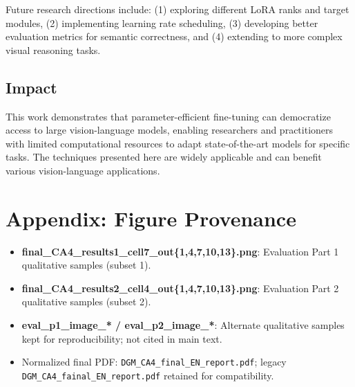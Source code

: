 \documentclass[conference]{IEEEtran}
\begin{document}
Future research directions include: (1) exploring different LoRA ranks and target modules, (2) implementing learning rate scheduling, (3) developing better evaluation metrics for semantic correctness, and (4) extending to more complex visual reasoning tasks.

\subsection{Impact}

This work demonstrates that parameter-efficient fine-tuning can democratize access to large vision-language models, enabling researchers and practitioners with limited computational resources to adapt state-of-the-art models for specific tasks. The techniques presented here are widely applicable and can benefit various vision-language applications.

\section{Appendix: Figure Provenance}
\begin{itemize}
    \item \textbf{final\_CA4\_results1\_cell7\_out\{1,4,7,10,13\}.png}: Evaluation Part 1 qualitative samples (subset 1).
    \item \textbf{final\_CA4\_results2\_cell4\_out\{1,4,7,10,13\}.png}: Evaluation Part 2 qualitative samples (subset 2).
    \item \textbf{eval\_p1\_image\_* / eval\_p2\_image\_*}: Alternate qualitative samples kept for reproducibility; not cited in main text.
    \item Normalized final PDF: \texttt{DGM\_CA4\_final\_EN\_report.pdf}; legacy \texttt{DGM\_CA4\_fainal\_EN\_report.pdf} retained for compatibility.
\end{itemize}
\end{document}
